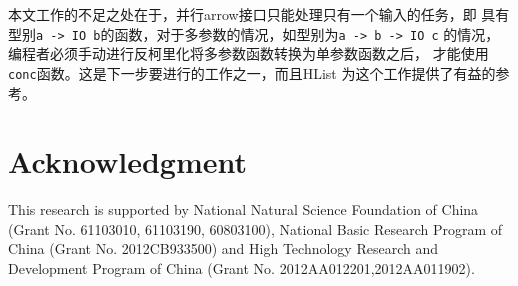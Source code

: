 \documentclass[conference]{IEEEtran}
\begin{document}
本文工作的不足之处在于，并行arrow接口只能处理只有一个输入的任务，即
具有型别\texttt{a -> IO b}的函数，对于多参数的情况，如型别为\texttt{a -> b -> IO c}
的情况，编程者必须手动进行反柯里化将多参数函数转换为单参数函数之后，
才能使用\texttt{conc}函数。这是下一步要进行的工作之一，而且HList\cite{Kiselyov2004}
为这个工作提供了有益的参考。



\section*{Acknowledgment}
This research is supported by National Natural Science Foundation of China
(Grant No. 61103010, 61103190, 60803100), National Basic Research Program
of China (Grant No. 2012CB933500) and High Technology Research and Development
Program of China (Grant No. 2012AA012201,2012AA011902).



%
%
%






\end{document}
